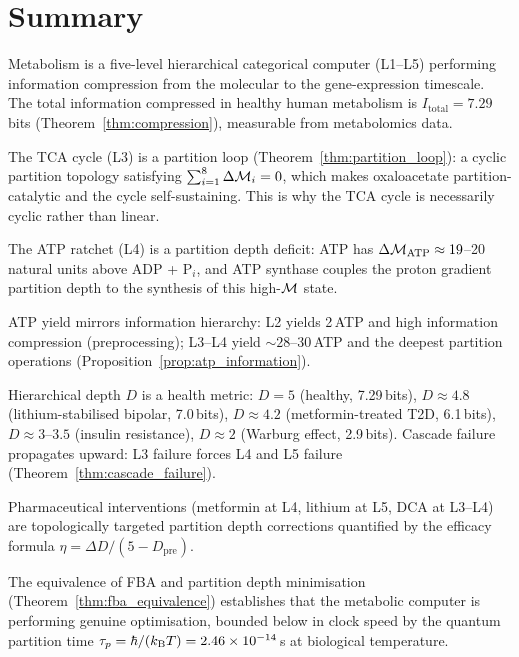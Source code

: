 \section{Summary}
\label{sec:metabolic_summary}

\begin{chapterbox}
Metabolism is a five-level hierarchical categorical computer (L1--L5)
performing information compression from the molecular to the gene-expression
timescale. The total information compressed in healthy human metabolism is
$I_{\mathrm{total}} = 7.29$ bits (Theorem~\ref{thm:compression}), measurable
from metabolomics data.

The TCA cycle (L3) is a partition loop (Theorem~\ref{thm:partition_loop}):
a cyclic partition topology satisfying $\sum_{i=1}^8 \Delta\mathcal{M}_i = 0$,
which makes oxaloacetate partition-catalytic and the cycle self-sustaining.
This is why the TCA cycle is necessarily cyclic rather than linear.

The ATP ratchet (L4) is a partition depth deficit: ATP has
$\Delta\mathcal{M}_{\mathrm{ATP}} \approx 19$--20 natural units above ADP + P$_i$,
and ATP synthase couples the proton gradient partition depth to the synthesis
of this high-$\mathcal{M}$ state.

ATP yield mirrors information hierarchy: L2 yields 2\,ATP and high information
compression (preprocessing); L3--L4 yield $\sim 28$--$30$\,ATP and the deepest
partition operations (Proposition~\ref{prop:atp_information}).

Hierarchical depth $D$ is a health metric: $D = 5$ (healthy, 7.29\,bits),
$D \approx 4.8$ (lithium-stabilised bipolar, 7.0\,bits), $D \approx 4.2$
(metformin-treated T2D, 6.1\,bits), $D \approx 3$--$3.5$ (insulin resistance),
$D \approx 2$ (Warburg effect, 2.9\,bits). Cascade failure propagates upward:
L3 failure forces L4 and L5 failure (Theorem~\ref{thm:cascade_failure}).

Pharmaceutical interventions (metformin at L4, lithium at L5, DCA at L3--L4)
are topologically targeted partition depth corrections quantified by the
efficacy formula $\eta = \Delta D / (5 - D_{\mathrm{pre}})$.

The equivalence of FBA and partition depth minimisation
(Theorem~\ref{thm:fba_equivalence}) establishes that the metabolic computer
is performing genuine optimisation, bounded below in clock speed by the
quantum partition time $\tau_p = \hbar/(k_{\mathrm{B}} T) = 2.46 \times 10^{-14}$\,s
at biological temperature.
\end{chapterbox}

